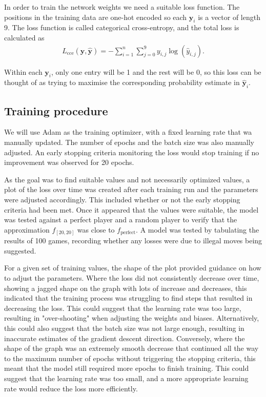 \documentclass{somasmsc}
\begin{document}
In order to train the network weights we need a suitable loss function. The positions in the training data are one-hot encoded so each $\pmb{y}_i$ is a vector of length 9. The loss function is called categorical cross-entropy, and the total loss is calculated as
\begin{align*}
   L_{\text{cce}}\left(\pmb{y},\hat{\pmb{y}}\right) = - \sum_{i=1}^n \sum_{j=0}^9 y_{i,j} \log\left(\hat{y}_{i,j}\right).
\end{align*}

Within each $\pmb{y}_i$, only one entry will be 1 and the rest will be 0, so this loss can be thought of as trying to maximise the corresponding probability estimate in $\hat{\pmb{y}}_i$.

\subsection{Training procedure}\label{ox:train}

We will use Adam as the training optimizer, with a fixed learning rate that wa manually updated. The number of epochs and the batch size was also manually adjusted. An early stopping criteria monitoring the loss would stop training if no improvement was observed for 20 epochs.

As the goal was to find suitable values and not necessarily optimized values, a plot of the loss over time was created after each training run and the parameters were adjusted accordingly. This included whether or not the early stopping criteria had been met. Once it appeared that the values were suitable, the model was tested against a perfect player and a random player to verify that the approximation $f_{\left[20,20\right]}$ was close to $f_{\text{perfect}}$. A model was tested by tabulating the results of 100 games, recording whether any losses were due to illegal moves being suggested.

For a given set of training values, the shape of the plot provided guidance on how to adjust the parameters. Where the loss did not consistently decrease over time, showing a jagged shape on the graph with lots of increase and decreases, this indicated that the training process was struggling to find steps that resulted in decreasing the loss. This could suggest that the learning rate was too large, resulting in "over-shooting" when adjusting the weights and biases. Alternatively, this could also suggest that the batch size was not large enough, resulting in inaccurate estimates of the gradient descent direction. Conversely, where the shape of the graph was an extremely smooth decrease that continued all the way to the maximum number of epochs without triggering the stopping criteria, this meant that the model still required more epochs to finish training. This could suggest that the learning rate was too small, and a more appropriate learning rate would reduce the loss more efficiently.
\end{document}

